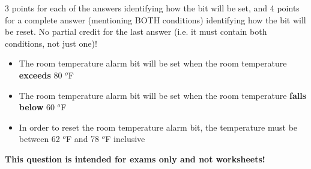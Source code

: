 
3 points for each of the answers identifying how the bit will be set, and 4 points for a complete answer (mentioning BOTH conditions) identifying how the bit will be reset.  No partial credit for the last answer (i.e. it must contain both conditions, not just one)!

\begin{itemize}
\item{} The room temperature alarm bit will be set when the room temperature {\bf exceeds} 80 $^{o}$F
\vskip 10pt
\item{} The room temperature alarm bit will be set when the room temperature {\bf falls below} 60 $^{o}$F
\vskip 10pt
\item{} In order to reset the room temperature alarm bit, the temperature must be between 62 $^{o}$F and 78 $^{o}$F inclusive
\end{itemize}







{\bf This question is intended for exams only and not worksheets!}



